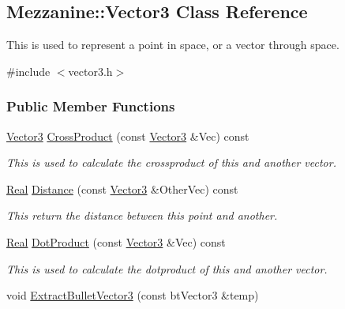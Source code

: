 \hypertarget{classMezzanine_1_1Vector3}{
\subsection{Mezzanine::Vector3 Class Reference}
\label{classMezzanine_1_1Vector3}
}


This is used to represent a point in space, or a vector through space.  




{\ttfamily \#include $<$vector3.h$>$}

\subsubsection*{Public Member Functions}
\begin{DoxyCompactItemize}
\item 
\hyperlink{classMezzanine_1_1Vector3}{Vector3} \hyperlink{classMezzanine_1_1Vector3_ad929fbbc2035229f84a3fc8946f7e6c3}{CrossProduct} (const \hyperlink{classMezzanine_1_1Vector3}{Vector3} \&Vec) const 
\begin{DoxyCompactList}\small\item\em This is used to calculate the crossproduct of this and another vector. \item\end{DoxyCompactList}\item 
\hyperlink{namespaceMezzanine_a726731b1a7df72bf3583e4a97282c6f6}{Real} \hyperlink{classMezzanine_1_1Vector3_a712b2063e6aa4c58002628ecf08b15fe}{Distance} (const \hyperlink{classMezzanine_1_1Vector3}{Vector3} \&OtherVec) const 
\begin{DoxyCompactList}\small\item\em This return the distance between this point and another. \item\end{DoxyCompactList}\item 
\hyperlink{namespaceMezzanine_a726731b1a7df72bf3583e4a97282c6f6}{Real} \hyperlink{classMezzanine_1_1Vector3_ad49630dbeff2f1b63ce7c7e1d0faf4b8}{DotProduct} (const \hyperlink{classMezzanine_1_1Vector3}{Vector3} \&Vec) const 
\begin{DoxyCompactList}\small\item\em This is used to calculate the dotproduct of this and another vector. \item\end{DoxyCompactList}\item 
void \hyperlink{classMezzanine_1_1Vector3_afc8fcb7fb9de94c05db4cc8a568363f9}{ExtractBulletVector3} (const btVector3 \&temp)

\end{DoxyCompactItemize}
